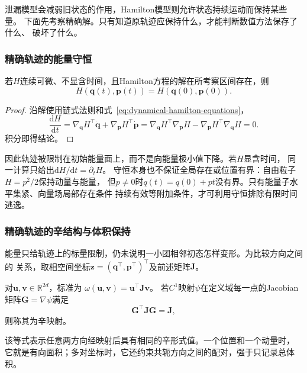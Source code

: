 泄漏模型会减弱旧状态的作用，Hamilton模型则允许状态持续运动而保持某些量。
下面先考察精确解。只有知道原轨迹应保持什么，才能判断数值方法保存了什么、
破坏了什么。

\subsubsection{精确轨迹的能量守恒}

\begin{theorem}[Hamilton能量守恒]
  \label{thm:dynamical-hamiltonian-energy-conservation}
  若$H$连续可微、不显含时间，且Hamilton方程的解在所考察区间存在，则
  \[
    H(\bm q(t),\bm p(t))=H(\bm q(0),\bm p(0)).
  \]
\end{theorem}
\begin{proof}
  沿解使用链式法则和式~\eqref{eq:dynamical-hamilton-equations}，
  \[
    \frac{\mathrm dH}{\mathrm dt}
    =\nabla_{\bm q}H^\top\dot{\bm q}
      +\nabla_{\bm p}H^\top\dot{\bm p}
    =\nabla_{\bm q}H^\top\nabla_{\bm p}H
      -\nabla_{\bm p}H^\top\nabla_{\bm q}H=0.
  \]
  积分即得结论。
\end{proof}
因此轨迹被限制在初始能量面上，而不是向能量极小值下降。若$H$显含时间，
同一计算只给出$\mathrm dH/\mathrm dt=\partial_tH$。
守恒本身也不保证全局存在或位置有界：自由粒子$H=p^2/2$保持动量与能量，
但$p\neq0$时$q(t)=q(0)+pt$没有界。只有能量子水平集紧、向量场局部存在条件
持续有效等附加条件，才可利用守恒排除有限时间逃逸。

\subsubsection{精确轨迹的辛结构与体积保持}

能量只给轨迹上的标量限制，仍未说明一小团相邻初态怎样变形。为比较方向之间的
关系，取相空间坐标$\bm z=(\bm q^\top,\bm p^\top)^\top$及前述矩阵$\bm J$。
\begin{definition}[标准辛形式与辛映射]
  \label{def:dynamical-symplectic-form-map}
  对$\bm u,\bm v\in\mathbb R^{2d}$，标准为
  $\omega(\bm u,\bm v)=\bm u^\top\bm J\bm v$。
  若$C^1$映射$\psi$在定义域每一点的Jacobian矩阵$\bm G=\nabla\psi$满足
  \begin{equation}
    \bm G^\top\bm J\bm G=\bm J,
    \label{eq:dynamical-symplectic-map}
  \end{equation}
  则称其为辛映射。
\end{definition}
该等式表示任意两方向经映射后具有相同的辛形式值。一个位置和一个动量时，
它就是有向面积；多对坐标时，它还约束共轭方向之间的配对，强于只记录总体积。

